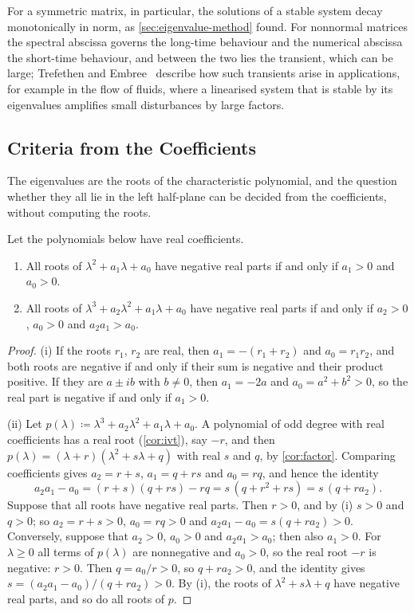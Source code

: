 For a symmetric matrix, in particular, the solutions of a stable system decay monotonically in norm, as \cref{sec:eigenvalue-method} found. For nonnormal matrices the spectral abscissa governs the long-time behaviour and the numerical abscissa the short-time behaviour, and between the two lies the transient, which can be large; Trefethen and Embree~\cite{trefethen2005} describe how such transients arise in applications, for example in the flow of fluids, where a linearised system that is stable by its eigenvalues amplifies small disturbances by large factors.

\subsection{Criteria from the Coefficients}

The eigenvalues are the roots of the characteristic polynomial, and the question whether they all lie in the left half-plane can be decided from the coefficients, without computing the roots.

\begin{theorem}
\label{thm:hurwitz-small}
Let the polynomials below have real coefficients.
\begin{enumerate}
\item All roots of $\lambda^2+a_1\lambda+a_0$ have negative real parts if and only if $a_1>0$ and $a_0>0$.
\item All roots of $\lambda^3+a_2\lambda^2+a_1\lambda+a_0$ have negative real parts if and only if $a_2>0$, $a_0>0$ and $a_2a_1>a_0$.
\end{enumerate}
\end{theorem}

\begin{proof}
(i) If the roots $r_1$, $r_2$ are real, then $a_1=-(r_1+r_2)$ and $a_0=r_1r_2$, and both roots are negative if and only if their sum is negative and their product positive. If they are $a\pm ib$ with $b\ne0$, then $a_1=-2a$ and $a_0=a^2+b^2>0$, so the real part is negative if and only if $a_1>0$.

(ii) Let $p(\lambda)\coloneqq\lambda^3+a_2\lambda^2+a_1\lambda+a_0$. A polynomial of odd degree with real coefficients has a real root (\cref{cor:ivt}), say $-r$, and then $p(\lambda)=(\lambda+r)(\lambda^2+s\lambda+q)$ with real $s$ and $q$, by \cref{cor:factor}. Comparing coefficients gives $a_2=r+s$, $a_1=q+rs$ and $a_0=rq$, and hence the identity
\[
a_2a_1-a_0=(r+s)(q+rs)-rq=s\,(q+r^2+rs)=s\,(q+ra_2).
\]
Suppose that all roots have negative real parts. Then $r>0$, and by (i) $s>0$ and $q>0$; so $a_2=r+s>0$, $a_0=rq>0$ and $a_2a_1-a_0=s(q+ra_2)>0$. Conversely, suppose that $a_2>0$, $a_0>0$ and $a_2a_1>a_0$; then also $a_1>0$. For $\lambda\ge0$ all terms of $p(\lambda)$ are nonnegative and $a_0>0$, so the real root $-r$ is negative: $r>0$. Then $q=a_0/r>0$, so $q+ra_2>0$, and the identity gives $s=(a_2a_1-a_0)/(q+ra_2)>0$. By (i), the roots of $\lambda^2+s\lambda+q$ have negative real parts, and so do all roots of $p$.
\end{proof}

